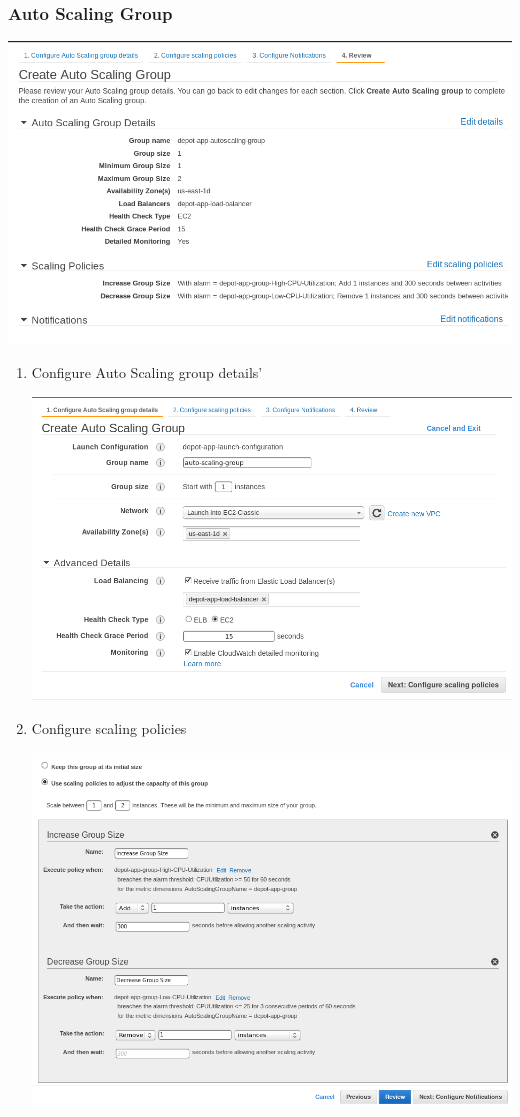 \documentclass{beamer}
\begin{document}
\begin{frame}
\frametitle{Auto Scaling Group}
\begin{center}
\includegraphics[scale=0.30]{review-autoscale.png}
\end{center}
\begin{enumerate}
\item Configure Auto Scaling group details'
\begin{center}
\includegraphics[scale=0.30]{create-auto-scaling01.png}
\end{center}
\item Configure scaling policies 
\begin{center}
\includegraphics[scale=0.25]{configure-scaling-policies.png}

\end{center}
\end{enumerate}
\end{frame}
\end{document}
